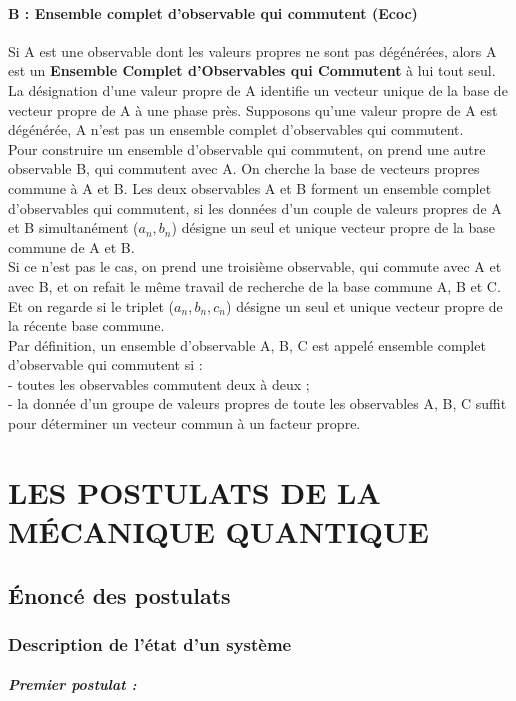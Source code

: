 \documentclass[12pt,a4paper,titlepage]{book}
\begin{document}
\subsubsection{B : Ensemble complet d'observable qui commutent (Ecoc)}
Si A est une observable dont les valeurs propres ne sont pas dégénérées, alors A est un \textbf{Ensemble Complet d'Observables qui Commutent} à lui tout seul. La désignation d'une valeur propre de A identifie un vecteur unique de la base de vecteur propre de A à une phase près. Supposons qu'une valeur propre de A est dégénérée, A n'est pas un ensemble complet d'observables qui commutent.\\

Pour construire un ensemble d'observable qui commutent, on prend une autre observable B, qui commutent avec A. On cherche la base de vecteurs propres commune à A et B. Les deux observables A et B forment un ensemble complet d'observables qui commutent, si les données d'un couple de valeurs propres de A et B simultanément ($a_n, b_n$) désigne un seul et unique vecteur propre de la base commune de A et B.\\

Si ce n'est pas le cas, on prend une troisième observable, qui commute avec A et avec B, et on refait le même travail de recherche de la base commune A, B et C. Et on regarde si le triplet ($a_n, b_n, c_n$) désigne un seul et unique vecteur propre de la récente base commune.\\

Par définition, un ensemble d'observable A, B, C est appelé ensemble complet d'observable qui commutent si :\\
- toutes les observables commutent deux à deux ;\\
- la donnée d'un groupe de valeurs propres de toute les observables A, B, C suffit pour déterminer un vecteur commun à un facteur propre.

\chapter{LES POSTULATS DE LA MÉCANIQUE QUANTIQUE}
\section{Énoncé des postulats}
\subsection{Description de l'état d'un système}
\paragraph*{Premier postulat :}
\end{document}
